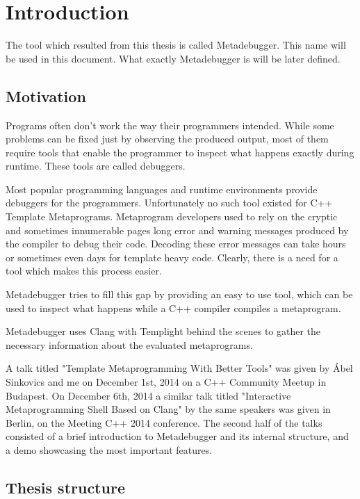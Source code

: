 
\chapter{Introduction}

The tool which resulted from this thesis is called Metadebugger. This name will
be used in this document. What exactly Metadebugger is will be later defined.

\section{Motivation}

Programs often don't work the way their programmers intended. While some
problems can be fixed just by observing the produced output, most of them
require tools that enable the programmer to inspect what happens exactly
during runtime. These tools are called debuggers.

Most popular programming languages and runtime environments provide debuggers
for the programmers. Unfortunately no such tool existed for C++ Template
Metaprograms\cite{cpp14}. Metaprogram developers used to rely on the cryptic
and sometimes innumerable pages long error and warning messages produced by the
compiler to debug their code. Decoding these error messages can take hours or
sometimes even days for template heavy code\cite{sinkovics-phd,boost-spirit}.
Clearly, there is a need for a tool which makes this process easier.

Metadebugger tries to fill this gap by providing an easy to use tool, which can
be used to inspect what happens while a C++ compiler compiles a metaprogram.

Metadebugger uses Clang with Templight behind the scenes to gather the
necessary information about the evaluated metaprograms.

A talk titled "Template Metaprogramming With Better Tools" was given by Ábel
Sinkovics and me on December 1st, 2014 on a C++ Community
Meetup in Budapest\cite{cpp-meetup}. On December 6th, 2014 a similar talk
titled "Interactive Metaprogramming Shell Based on Clang" by the same speakers
was given in Berlin, on the Meeting C++ 2014 conference\cite{meeting-cpp}.
The second half of the talks consisted of a brief introduction to Metadebugger
and its internal structure, and a demo showcasing the most important features.

\section{Thesis structure}


